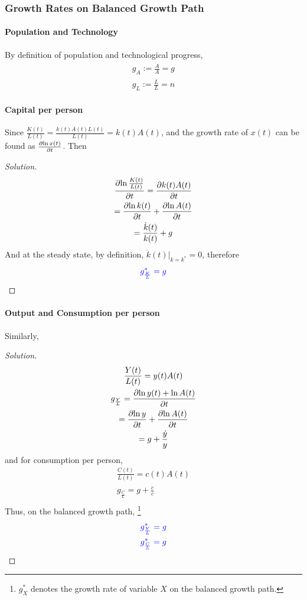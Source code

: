 \documentclass[11pt]{article}
\begin{document}
			\subsubsection{Growth Rates on Balanced Growth Path}
			\paragraph{Population and Technology} By definition of population and technological progress,
			\begin{gather}
				g_A := \frac{\dot{A}}{A} = g \\
				g_L := \frac{\dot{L}}{L} = n
			\end{gather}
			
			\paragraph{Capital per person} Since $\frac{K(t)}{L(t)} = \frac{k(t)A(t)L(t)}{L(t)} = k(t)A(t)$, and the growth rate of $x(t)$ can be found as $\frac{\partial{\ln{x(t)}}}{\partial{t}}$. Then
			\begin{proof}[Solution]
				\begin{gather}
					\frac{\partial{\ln{\frac{K(t)}{L(t)}}}}{\partial{t}} = \frac{\partial{k(t)A(t)}}{\partial{t}} \\
					= \frac{\partial{\ln{k(t)}}}{\partial{t}} + \frac{\partial{\ln{A(t)}}}{\partial{t}} \\
					= \frac{\dot{k}(t)}{k(t)} + g \\
				\end{gather}
				And at the steady state, by definition, $\dot{k}(t)|_{k=k^*} = 0$, therefore 
				\begin{equation}
					\textcolor{blue}{
						g_{\frac{K}{L}}^* = g
					}
				\end{equation}
			\end{proof}
			
			\paragraph{Output and Consumption per person} Similarly,
			\begin{proof}[Solution]
				\begin{gather}
					\frac{Y(t)}{L(t)} = y(t)A(t) \\
					g_{\frac{Y}{L}} = \frac{\partial{\ln{y(t)} + \ln{A(t)}}}{\partial{t}} \\
					= \frac{\partial{\ln{y}}}{\partial{t}} + \frac{\partial{\ln{A(t)}}}{\partial{t}} \\
					= g + \frac{\dot{y}}{y}
				\end{gather}
				and for consumption per person,
				\begin{gather}
					\frac{C(t)}{L(t)} = c(t)A(t)\\
					g_{\frac{C}{L}} = g + \frac{\dot{c}}{c} \\
				\end{gather}
				Thus, on the balanced growth path, \footnote{$g_X^*$ denotes the growth rate of variable $X$ on the balanced growth path.}
				\begin{gather}
					\textcolor{blue}{
						g_{\frac{Y}{L}}^* = g
					}
					\\
					\textcolor{blue}{
						g_{\frac{C}{L}}^* = g
					}
				\end{gather}
			\end{proof}
			
\end{document}
